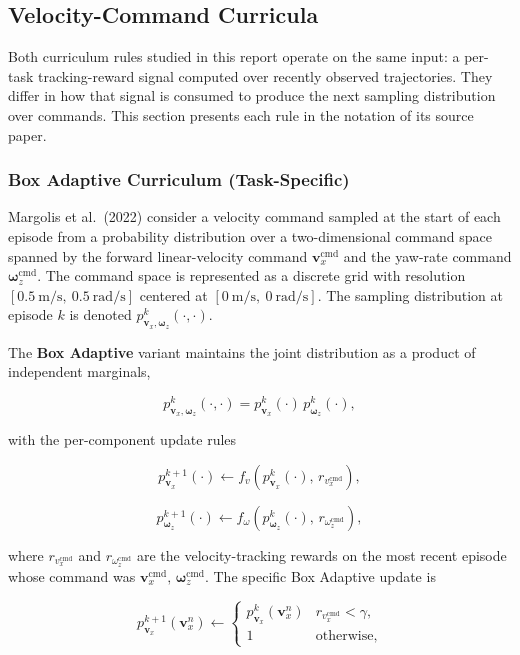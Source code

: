 \subsection{Velocity-Command Curricula}

Both curriculum rules studied in this report operate on the same input: a per-task tracking-reward signal computed over recently observed trajectories. They differ in how that signal is consumed to produce the next sampling distribution over commands. This section presents each rule in the notation of its source paper.

\subsubsection{Box Adaptive Curriculum (Task-Specific)}

Margolis et al.\ (2022) consider a velocity command sampled at the start of each episode from a probability distribution over a two-dimensional command space spanned by the forward linear-velocity command $\mathbf{v}_x^{\mathrm{cmd}}$ and the yaw-rate command $\boldsymbol{\omega}_z^{\mathrm{cmd}}$. The command space is represented as a discrete grid with resolution $[0.5\ \mathrm{m/s},\ 0.5\ \mathrm{rad/s}]$ centered at $[0\ \mathrm{m/s},\ 0\ \mathrm{rad/s}]$. The sampling distribution at episode $k$ is denoted $p_{\mathbf{v}_x,\boldsymbol{\omega}_z}^{k}(\cdot, \cdot)$.

The \textbf{Box Adaptive} variant maintains the joint distribution as a product of independent marginals,

\[
p_{\mathbf{v}_x,\boldsymbol{\omega}_z}^{k}(\cdot, \cdot) = p_{\mathbf{v}_x}^{k}(\cdot)\, p_{\boldsymbol{\omega}_z}^{k}(\cdot),
\]

with the per-component update rules

\[
p_{\mathbf{v}_x}^{k+1}(\cdot) \leftarrow f_v\!\left( p_{\mathbf{v}_x}^{k}(\cdot),\, r_{v_x^{\mathrm{cmd}}} \right), \tag{8a}
\]

\[
p_{\boldsymbol{\omega}_z}^{k+1}(\cdot) \leftarrow f_\omega\!\left( p_{\boldsymbol{\omega}_z}^{k}(\cdot),\, r_{\omega_z^{\mathrm{cmd}}} \right), \tag{8b}
\]

where $r_{v_x^{\mathrm{cmd}}}$ and $r_{\omega_z^{\mathrm{cmd}}}$ are the velocity-tracking rewards on the most recent episode whose command was $\mathbf{v}_x^{\mathrm{cmd}},\, \boldsymbol{\omega}_z^{\mathrm{cmd}}$. The specific Box Adaptive update is

\[
p_{\mathbf{v}_x}^{k+1}(\mathbf{v}_x^n) \leftarrow
\begin{cases}
p_{\mathbf{v}_x}^{k}(\mathbf{v}_x^n) & r_{v_x^{\mathrm{cmd}}} < \gamma, \\
1 & \text{otherwise},
\end{cases} \tag{10a}
\]

